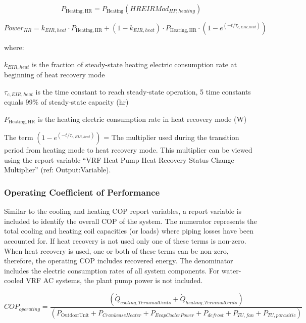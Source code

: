 \begin{equation}
  P_{\mathrm{Heating, HR}} = P_{\mathrm{Heating}} \left( HREIRMod_{HP,heating} \right)
\end{equation}

\begin{equation}
  Power_{HR} = k_{EIR,heat} \cdot P_{\mathrm{Heating, HR}} + \left( 1 - k_{EIR,heat} \right) \cdot P_{\mathrm{Heating, HR}} \cdot \left( 1 - e^{\left( -t / \tau_{c,EIR,heat} \right)} \right)
\end{equation}

where:

\(k_{EIR,heat}\) is the fraction of steady-state heating electric consumption rate at beginning of heat recovery mode

\(\tau_{c,EIR,heat}\) is the time constant to reach steady-state operation, 5 time constants equals 99\% of steady-state capacity (hr)

$P_{\mathrm{Heating, HR}}$ is the heating electric consumption rate in heat recovery mode (W)

The term \(\left( 1 - e^{\left( -t / \tau_{c,EIR,heat} \right)} \right)\) = The multiplier used during the transition period from heating mode to heat recovery mode. This multiplier can be viewed using the report variable ``VRF Heat Pump Heat Recovery Status Change Multiplier'' (ref: Output:Variable).

\subsubsection{Operating Coefficient of Performance}\label{operating-coefficient-of-performance}

Similar to the cooling and heating COP report variables, a report variable is included to identify the overall COP of the system. The numerator represents the total cooling and heating coil capacities (or loads) where piping losses have been accounted for. If heat recovery is not used only one of these terms is non-zero. When heat recovery is used, one or both of these terms can be non-zero, therefore, the operating COP includes recovered energy. The denominator includes the electric consumption rates of all system components. For water-cooled VRF AC systems, the plant pump power is not included.

\begin{equation}
  COP_{operating} = \frac{\left( \dot{Q}_{cooling,TerminalUnits} + \dot{Q}_{heating,TerminalUnits} \right)}{\left( P_{\mathrm{OutdoorUnit}} + P_{CrankcaseHeater} + P_{EvapCoolerPower} + P_{defrost} + P_{TU,fan} + P_{TU,parasitic} \right)}
\end{equation}

